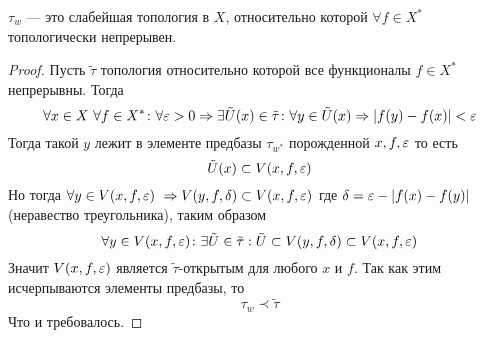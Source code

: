 \begin{claim}
	$\tau_w$ --- это слабейшая топология в $X$, относительно которой $\forall f \in X^*$ топологически непрерывен. 
\end{claim}
\begin{proof}
	Пусть $\tilde{\tau}$ топология относительно которой все функционалы $f\in X^*$ непрерывны. Тогда 
	$$
	\forall x \in X\ \forall f \in X^* \colon \forall \varepsilon > 0 \Rightarrow\exists \tilde{U}(x) \in \tilde{\tau}\colon \forall y \in \tilde{U}(x) \Rightarrow |f(y) - f(x)| < \varepsilon
	$$
	Тогда такой $y$ лежит в элементе предбазы $\tau_{w^*}$ порожденной $x,f,\varepsilon$ то есть
	$$
	\tilde{U}(x) \subset V(x,f,\varepsilon)
	$$
	Но тогда $\forall y \in V(x,f,\varepsilon) \ \Rightarrow V(y,f,\delta) \subset V(x,f,\varepsilon)$ где $\delta = \varepsilon - |f(x) - f(y)|$ (неравество треугольника), таким образом
	$$
	\forall y \in V(x,f,\varepsilon)\colon \exists \tilde{U} \in \tilde{\tau}: \tilde{U} \subset V(y,f,\delta) \subset V(x,f,\varepsilon)
	$$
	Значит $V(x,f,\varepsilon)$ является $\tilde{\tau}$-открытым для любого $x$ и $f$. Так как этим исчерпываются элементы предбазы, то  
	$$
	\tau_w \prec \tilde{\tau}
	$$
	Что и требовалось.
\end{proof}